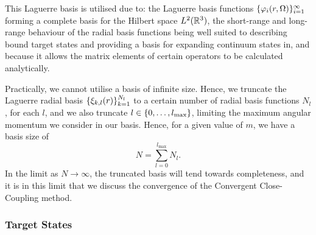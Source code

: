 \documentclass[draft]{article}
\begin{document}
This Laguerre basis is utilised due to: the Laguerre basis functions
$\lbrace\varphi_{i}(r, \Omega)\rbrace_{i = 1}^{\infty}$ forming a complete basis
for the Hilbert space $L^{2}(\mathbb{R}^{3})$, the short-range and long-range
behaviour of the radial basis functions being well suited to describing bound
target states and providing a basis for expanding continuum states in, and
because it allows the matrix elements of certain operators to be calculated
analytically.

Practically, we cannot utilise a basis of infinite size.
Hence, we truncate the Laguerre radial basis
$\lbrace\xi_{k, l}(r)\rbrace_{k = 1}^{N_{l}}$ to a certain number of radial basis
functions $N_{l}$, for each $l$, and we also truncate
$l \in \lbrace0, \dotsc, l_{\max}\rbrace$,
limiting the maximum angular momentum we consider in our basis.
Hence, for a given value of $m$, we have a basis size of
\begin{equation}
  \label{eq:basis-size}
  N
  =
  \sum_{l = 0}^{l_{\max}}
  N_{l}
  .
\end{equation}
In the limit as $N \to \infty$, the truncated basis will tend towards
completeness, and it is in this limit that we discuss the convergence of the
Convergent Close-Coupling method.

\subsubsection{Target States}
\label{sec:target-states}
\end{document}
